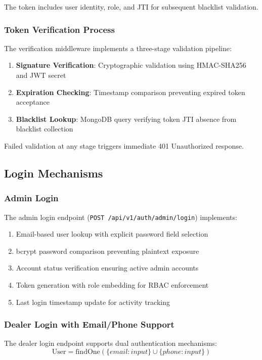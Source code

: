 \documentclass[conference]{IEEEtran}
\begin{document}
The token includes user identity, role, and JTI for subsequent blacklist validation.

\subsubsection{Token Verification Process}
The verification middleware implements a three-stage validation pipeline:

\begin{enumerate}
\item \textbf{Signature Verification}: Cryptographic validation using HMAC-SHA256 and JWT secret
\item \textbf{Expiration Checking}: Timestamp comparison preventing expired token acceptance
\item \textbf{Blacklist Lookup}: MongoDB query verifying token JTI absence from blacklist collection
\end{enumerate}

Failed validation at any stage triggers immediate 401 Unauthorized response.

\subsection{Login Mechanisms}

\subsubsection{Admin Login}
The admin login endpoint (\texttt{POST /api/v1/auth/admin/login}) implements:
\begin{enumerate}
\item Email-based user lookup with explicit password field selection
\item bcrypt password comparison preventing plaintext exposure
\item Account status verification ensuring active admin accounts
\item Token generation with role embedding for RBAC enforcement
\item Last login timestamp update for activity tracking
\end{enumerate}

\subsubsection{Dealer Login with Email/Phone Support}
The dealer login endpoint supports dual authentication mechanisms:
\begin{equation}
\text{User} = \text{findOne}(\{email: input\} \cup \{phone: input\})
\end{equation}
\end{document}
